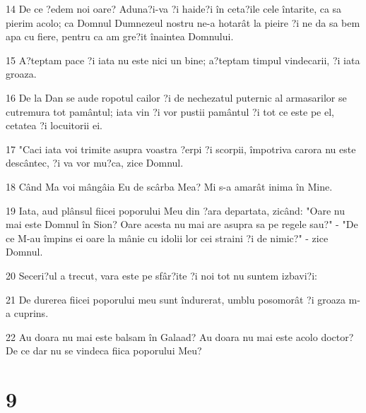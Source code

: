 \par 14 De ce ?edem noi oare? Aduna?i-va ?i haide?i în ceta?ile cele întarite, ca sa pierim acolo; ca Domnul Dumnezeul nostru ne-a hotarât la pieire ?i ne da sa bem apa cu fiere, pentru ca am gre?it înaintea Domnului.
\par 15 A?teptam pace ?i iata nu este nici un bine; a?teptam timpul vindecarii, ?i iata groaza.
\par 16 De la Dan se aude ropotul cailor ?i de nechezatul puternic al armasarilor se cutremura tot pamântul; iata vin ?i vor pustii pamântul ?i tot ce este pe el, cetatea ?i locuitorii ei.
\par 17 "Caci iata voi trimite asupra voastra ?erpi ?i scorpii, împotriva carora nu este descântec, ?i va vor mu?ca, zice Domnul.
\par 18 Când Ma voi mângâia Eu de scârba Mea? Mi s-a amarât inima în Mine.
\par 19 Iata, aud plânsul fiicei poporului Meu din ?ara departata, zicând: "Oare nu mai este Domnul în Sion? Oare acesta nu mai are asupra sa pe regele sau?" - "De ce M-au împins ei oare la mânie cu idolii lor cei straini ?i de nimic?" - zice Domnul.
\par 20 Seceri?ul a trecut, vara este pe sfâr?ite ?i noi tot nu suntem izbavi?i:
\par 21 De durerea fiicei poporului meu sunt îndurerat, umblu posomorât ?i groaza m-a cuprins.
\par 22 Au doara nu mai este balsam în Galaad? Au doara nu mai este acolo doctor? De ce dar nu se vindeca fiica poporului Meu?

\chapter{9}

